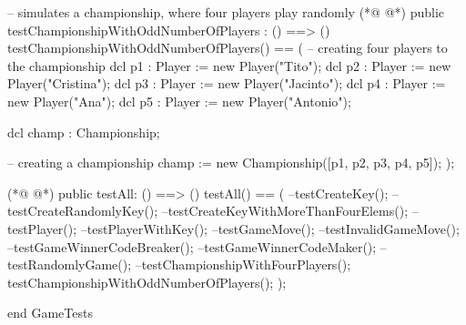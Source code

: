 \begin{vdmpp}[breaklines=true]
  -- simulates a championship, where four players play randomly 
(*@
\label{testChampionshipWithOddNumberOfPlayers:262}
@*)
  public testChampionshipWithOddNumberOfPlayers : () ==> ()
   testChampionshipWithOddNumberOfPlayers() == (
    -- creating four players to the championship
    dcl p1 : Player := new Player("Tito");
    dcl p2 : Player := new Player("Cristina");
    dcl p3 : Player := new Player("Jacinto");
    dcl p4 : Player := new Player("Ana");
    dcl p5 : Player := new Player("Antonio");
    
    dcl champ : Championship;
    
    -- creating a championship
    champ := new Championship([p1, p2, p3, p4, p5]);
   );
  
(*@
\label{testAll:277}
@*)
  public testAll: () ==> ()
  testAll() == (
   --testCreateKey();
   --testCreateRandomlyKey();
   --testCreateKeyWithMoreThanFourElems();
    --testPlayer();
    --testPlayerWithKey();
    --testGameMove();
    --testInvalidGameMove();
    --testGameWinnerCodeBreaker();
    --testGameWinnerCodeMaker();
    --testRandomlyGame();
    --testChampionshipWithFourPlayers();
    testChampionshipWithOddNumberOfPlayers();
  );
  
end GameTests
\end{vdmpp}
